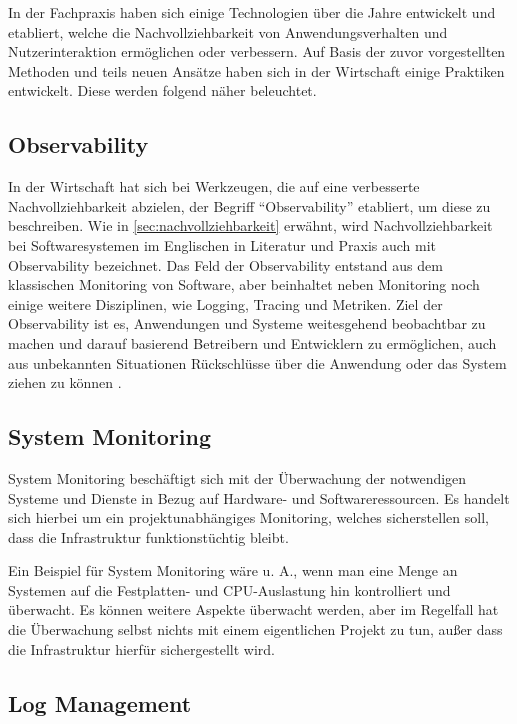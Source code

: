 In der Fachpraxis haben sich einige Technologien über die Jahre entwickelt und etabliert, welche die Nachvollziehbarkeit von Anwendungsverhalten und Nutzerinteraktion ermöglichen oder verbessern. Auf Basis der zuvor vorgestellten Methoden und teils neuen Ansätze haben sich in der Wirtschaft einige Praktiken entwickelt. Diese werden folgend näher beleuchtet.

\subsection{Observability}

In der Wirtschaft hat sich bei Werkzeugen, die auf eine verbesserte Nachvollziehbarkeit abzielen, der Begriff \enquote{Observability} etabliert, um diese zu beschreiben. Wie in \autoref{sec:nachvollziehbarkeit} erwähnt, wird Nachvollziehbarkeit bei Softwaresystemen im Englischen in Literatur und Praxis auch mit Observability bezeichnet. Das Feld der Observability entstand aus dem klassischen Monitoring von Software, aber beinhaltet neben Monitoring noch einige weitere Disziplinen, wie Logging, Tracing und Metriken. Ziel der Observability ist es, Anwendungen und Systeme weitesgehend beobachtbar zu machen und darauf basierend Betreibern und Entwicklern zu ermöglichen, auch aus unbekannten Situationen Rückschlüsse über die Anwendung oder das System ziehen zu können \cite{MichaelGrafBA}.

\subsection{System Monitoring}

System Monitoring beschäftigt sich mit der Überwachung der notwendigen Systeme und Dienste in Bezug auf Hardware- und Softwareressourcen. Es handelt sich hierbei um ein projektunabhängiges Monitoring, welches sicherstellen soll, dass die Infrastruktur funktionstüchtig bleibt.

Ein Beispiel für System Monitoring wäre u. A., wenn man eine Menge an Systemen auf die Festplatten- und CPU-Auslastung hin kontrolliert und überwacht. Es können weitere Aspekte überwacht werden, aber im Regelfall hat die Überwachung selbst nichts mit einem eigentlichen Projekt zu tun, außer dass die Infrastruktur hierfür sichergestellt wird.

\subsection{Log Management}


